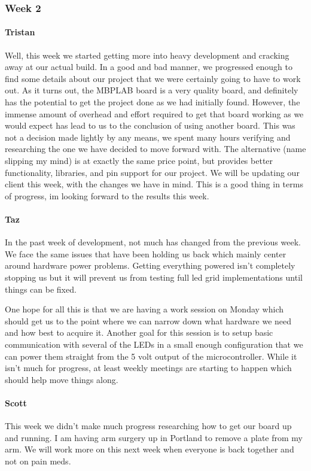 \documentclass[onecolumn, draftclsnofoot,10pt, compsoc]{IEEEtran}
\begin{document}
\subsubsection{Week 2}
\paragraph{Tristan}
Well, this week we started getting more into heavy development and cracking away at our actual build. In a good and bad manner, we progressed enough to find some details about our project that we were certainly going to have to work out. As it turns out, the MBPLAB board is a very quality board, and definitely has the potential to get the project done as we had initially found. However, the immense amount of overhead and effort required to get that board working as we would expect has lead to us to the conclusion of using another board. This was not a decision made lightly by any means, we spent many hours verifying and researching the one we have decided to move forward with. The alternative (name slipping my mind) is at exactly the same price point, but provides better functionality, libraries, and pin support for our project. We will be updating our client this week, with the changes we have in mind. This is a good thing in terms of progress, im looking forward to the results this week.
\paragraph{Taz}
In the past week of development, not much has changed from the previous week. We face the same issues that have been holding us back which mainly center around hardware power problems. Getting everything powered isn't completely stopping us but it will prevent us from testing full led grid implementations until things can be fixed.

One hope for all this is that we are having a work session on Monday which should get us to the point where we can narrow down what hardware we need and how best to acquire it. Another goal for this session is to setup basic communication with several of the LEDs in a small enough configuration that we can power them straight from the 5 volt output of the microcontroller. While it isn't much for progress, at least weekly meetings are starting to happen which should help move things along.
\paragraph{Scott}
This week we didn't make much progress researching how to get our board up and running. I am having arm surgery up in Portland to remove a plate from my arm. We will work more on this next week when everyone is back together and not on pain meds.
\end{document}
